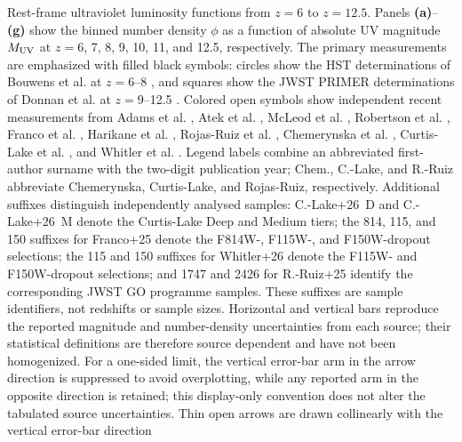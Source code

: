 \caption{\label{fig:uvlf-z6-12p5}
Rest-frame ultraviolet luminosity functions from $z=6$ to $z=12.5$.
Panels \textbf{(a)}--\textbf{(g)} show the binned number density
$\phi$ as a function of absolute UV magnitude $M_{\rm UV}$ at
$z=6$, 7, 8, 9, 10, 11, and 12.5, respectively.
The primary measurements are emphasized with filled black symbols:
circles show the HST determinations of Bouwens et al. at $z=6$--8
\citep{Bouwens2021UVLF}, and squares show the JWST PRIMER
determinations of Donnan et al. at $z=9$--12.5
\citep{Donnan2024PRIMER}.
Colored open symbols show independent recent measurements from
Adams et al. \citep{Adams2024EPOCHS}, Atek et al.
\citep{Atek2024UNCOVER}, McLeod et al. \citep{McLeod2024UVLF},
Robertson et al. \citep{Robertson2024JADES}, Franco et al.
\citep{Franco2025COSMOSWeb}, Harikane et al.
\citep{Harikane2025Spectroscopic}, Rojas-Ruiz et al.
\citep{RojasRuiz2025BoRG}, Chemerynska et al.
\citep{Chemerynska2026GLIMPSE}, Curtis-Lake et al.
\citep{CurtisLake2026JADESDR4}, and Whitler et al.
\citep{Whitler2026JADES}.
Legend labels combine an abbreviated first-author surname with the
two-digit publication year; \mbox{Chem.}, \mbox{C.-Lake}, and
\mbox{R.-Ruiz} abbreviate Chemerynska, Curtis-Lake, and Rojas-Ruiz,
respectively. Additional suffixes distinguish independently analysed
samples: \mbox{C.-Lake+26 D} and \mbox{C.-Lake+26 M} denote the
Curtis-Lake Deep and Medium tiers; the 814, 115, and 150 suffixes for
Franco+25 denote the F814W-, F115W-, and F150W-dropout selections;
the 115 and 150 suffixes for Whitler+26 denote the F115W- and
F150W-dropout selections; and 1747 and 2426 for R.-Ruiz+25 identify
the corresponding JWST GO programme samples. These suffixes are
sample identifiers, not redshifts or sample sizes.
Horizontal and vertical bars reproduce the reported magnitude and
number-density uncertainties from each source; their statistical
definitions are therefore source dependent and have not been
homogenized. For a one-sided limit, the vertical error-bar arm in the
arrow direction is suppressed to avoid overplotting, while any
reported arm in the opposite direction is retained; this display-only
convention does not alter the tabulated source uncertainties. Thin
open arrows are drawn collinearly with the vertical error-bar direction
}
